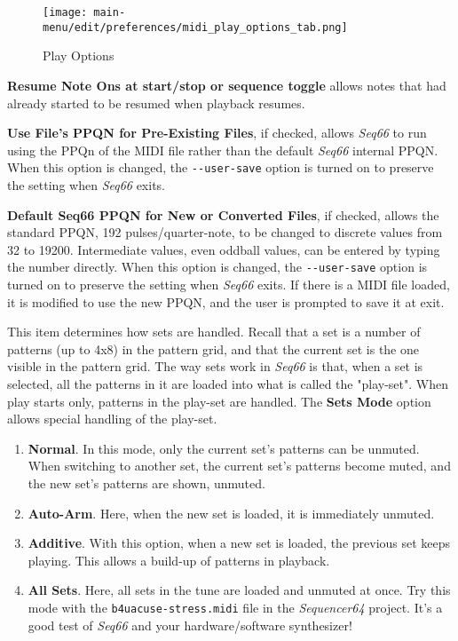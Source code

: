 \begin{figure}[H]
   \centering 
   \texttt{[image: main-menu/edit/preferences/midi\_play\_options\_tab.png]}
   \caption{Play Options}
   \label{fig:midi_play_options_tab}
\end{figure}

   \setcounter{ItemCounter}{0}      %

   \textbf{Resume Note Ons at start/stop or sequence toggle}
   allows notes that had already started
   to be resumed when playback resumes.

   \textbf{Use File's PPQN for Pre-Existing Files}, if checked, allows
   \textsl{Seq66} to run using the PPQn of the MIDI file rather than
   the default \textsl{Seq66} internal PPQN.
   When this option is changed, the \texttt{-{}-user-save} option is turned on
   to preserve the setting when \textsl{Seq66} exits.

   \textbf{Default Seq66 PPQN for New or Converted Files}, if checked, allows
   the standard PPQN, 192 pulses/quarter-note, to be changed to discrete values
   from 32 to 19200.  Intermediate values, even oddball values, can be entered
   by typing the number directly.
   When this option is changed, the \texttt{-{}-user-save} option is turned on
   to preserve the setting when \textsl{Seq66} exits.
   If there is a MIDI file loaded, it is modified to use the new PPQN, and the
   user is prompted to save it at exit.

   This item determines how sets are handled.
   Recall that a set is a number of patterns (up to 4x8) in the pattern grid,
   and that the current set is the one visible in the pattern grid.
   The way sets work in \textsl{Seq66} is that, when a set is selected,
   all the patterns in it are loaded into what is called
   the "play-set".
   When play starts only, patterns in the play-set are handled.
   The \textbf{Sets Mode} option allows special handling of the play-set.

   \begin{enumerate}
      \item \textbf{Normal}.
         In this mode, only the current set's patterns can be unmuted.
         When switching to another set, the current set's patterns become
         muted, and the new set's patterns are shown, unmuted.
      \item \textbf{Auto-Arm}.
         Here, when the new set is loaded, it is immediately unmuted.
      \item \textbf{Additive}.
         With this option, when a new set is loaded, the previous set keeps
         playing. This allows a build-up of patterns in playback.
      \item \textbf{All Sets}.
         Here, all sets in the tune are loaded and unmuted at once.
         Try this mode with the \texttt{b4uacuse-stress.midi} file
         in the \textsl{Sequencer64} project.  It's a good test of
         \textsl{Seq66} and your hardware/software synthesizer!
   \end{enumerate}


